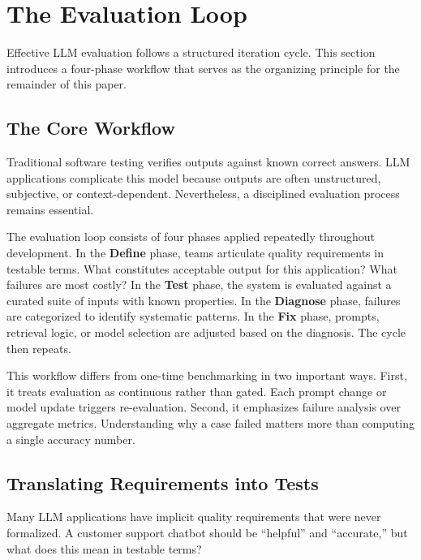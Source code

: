 
\section{The Evaluation Loop}
\label{sec:eval-loop}

Effective LLM evaluation follows a structured iteration cycle. This section introduces a four-phase workflow that serves as the organizing principle for the remainder of this paper.

\subsection{The Core Workflow}

Traditional software testing verifies outputs against known correct answers. LLM applications complicate this model because outputs are often unstructured, subjective, or context-dependent. Nevertheless, a disciplined evaluation process remains essential.

The evaluation loop consists of four phases applied repeatedly throughout development. In the \textbf{Define} phase, teams articulate quality requirements in testable terms. What constitutes acceptable output for this application? What failures are most costly? In the \textbf{Test} phase, the system is evaluated against a curated suite of inputs with known properties. In the \textbf{Diagnose} phase, failures are categorized to identify systematic patterns. In the \textbf{Fix} phase, prompts, retrieval logic, or model selection are adjusted based on the diagnosis. The cycle then repeats.

This workflow differs from one-time benchmarking in two important ways. First, it treats evaluation as continuous rather than gated. Each prompt change or model update triggers re-evaluation. Second, it emphasizes failure analysis over aggregate metrics. Understanding why a case failed matters more than computing a single accuracy number.

\subsection{Translating Requirements into Tests}

Many LLM applications have implicit quality requirements that were never formalized. A customer support chatbot should be ``helpful'' and ``accurate,'' but what does this mean in testable terms?

